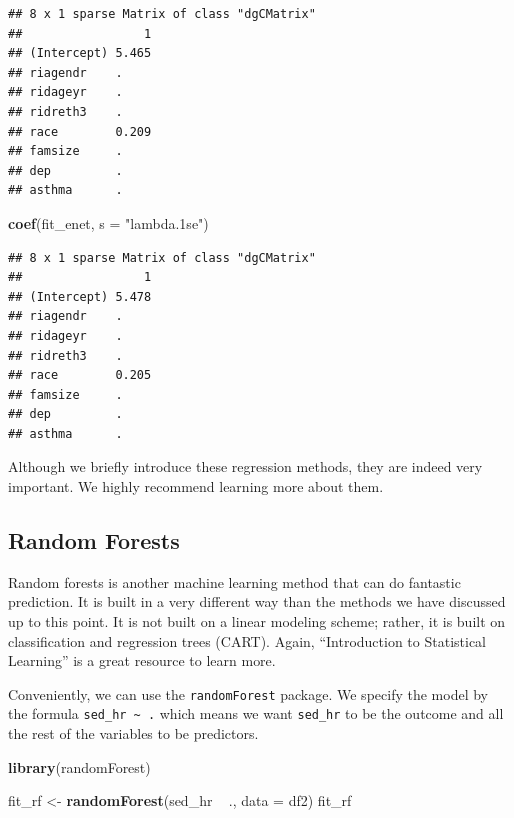 \documentclass[]{tufte-book}
\newenvironment{Shaded}{}{}
\newcommand{\KeywordTok}[1]{\textcolor[rgb]{0.00,0.44,0.13}{\textbf{#1}}}
\newcommand{\DataTypeTok}[1]{\textcolor[rgb]{0.56,0.13,0.00}{#1}}
\newcommand{\StringTok}[1]{\textcolor[rgb]{0.25,0.44,0.63}{#1}}
\newcommand{\OperatorTok}[1]{\textcolor[rgb]{0.40,0.40,0.40}{#1}}
\newcommand{\NormalTok}[1]{#1}
\theoremstyle{definition}
\theoremstyle{definition}
\theoremstyle{remark}
\begin{document}
\begin{verbatim}
## 8 x 1 sparse Matrix of class "dgCMatrix"
##                 1
## (Intercept) 5.465
## riagendr    .    
## ridageyr    .    
## ridreth3    .    
## race        0.209
## famsize     .    
## dep         .    
## asthma      .
\end{verbatim}

\begin{Shaded}
\begin{Highlighting}[]
\KeywordTok{coef}\NormalTok{(fit_enet, }\DataTypeTok{s =} \StringTok{"lambda.1se"}\NormalTok{)}
\end{Highlighting}
\end{Shaded}

\begin{verbatim}
## 8 x 1 sparse Matrix of class "dgCMatrix"
##                 1
## (Intercept) 5.478
## riagendr    .    
## ridageyr    .    
## ridreth3    .    
## race        0.205
## famsize     .    
## dep         .    
## asthma      .
\end{verbatim}

Although we briefly introduce these regression methods, they are indeed
very important. We highly recommend learning more about them.

\subsection*{Random Forests}\label{random-forests}

Random forests is another machine learning method that can do fantastic
prediction. It is built in a very different way than the methods we have
discussed up to this point. It is not built on a linear modeling scheme;
rather, it is built on classification and regression trees (CART).
Again, ``Introduction to Statistical Learning'' is a great resource to
learn more.

Conveniently, we can use the \texttt{randomForest} package. We specify
the model by the formula \texttt{sed\_hr\ \textasciitilde{}\ .} which
means we want \texttt{sed\_hr} to be the outcome and all the rest of the
variables to be predictors.

\begin{Shaded}
\begin{Highlighting}[]
\KeywordTok{library}\NormalTok{(randomForest)}

\NormalTok{fit_rf <-}\StringTok{ }\KeywordTok{randomForest}\NormalTok{(sed_hr }\OperatorTok{~}\StringTok{ }\NormalTok{., }\DataTypeTok{data =}\NormalTok{ df2)}
\NormalTok{fit_rf}
\end{Highlighting}
\end{Shaded}
\end{document}
